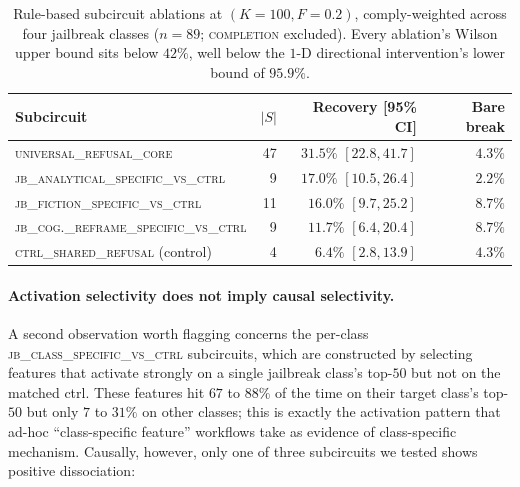 \documentclass{article}
\begin{document}
\begin{table}[h]
\centering
\small
\begin{tabular}{lrrr}
\toprule
Subcircuit & $|S|$ & Recovery [95\% CI] & Bare break \\
\midrule
\textsc{universal\_refusal\_core}              & 47 & $\mathbf{31.5\%}$ $[22.8, 41.7]$ & $4.3\%$ \\
\textsc{jb\_analytical\_specific\_vs\_ctrl}    & 9  & $17.0\%$ $[10.5, 26.4]$ & $2.2\%$ \\
\textsc{jb\_fiction\_specific\_vs\_ctrl}       & 11 & $16.0\%$ $[ 9.7, 25.2]$ & $8.7\%$ \\
\textsc{jb\_cog.\_reframe\_specific\_vs\_ctrl} & 9  & $11.7\%$ $[ 6.4, 20.4]$ & $8.7\%$ \\
\textsc{ctrl\_shared\_refusal} (control)       & 4  & $ 6.4\%$ $[ 2.8, 13.9]$ & $4.3\%$ \\
\bottomrule
\end{tabular}
\caption{Rule-based subcircuit ablations at $(K = 100, F = 0.2)$,
comply-weighted across four jailbreak classes ($n = 89$;
\textsc{completion} excluded). Every ablation's Wilson upper bound
sits below $42\%$, well below the $1$-D directional intervention's
lower bound of $95.9\%$.}
\label{tab:tier2-results}
\end{table}

\paragraph{Activation selectivity does not imply causal selectivity.}
A second observation worth flagging concerns the per-class
\textsc{jb\_class\_specific\_vs\_ctrl} subcircuits, which are
constructed by selecting features that activate strongly on a
single jailbreak class's top-$50$ but not on the matched ctrl.
These features hit $67$ to $88\%$ of the time on their target
class's top-$50$ but only $7$ to $31\%$ on other classes; this is
exactly the activation pattern that ad-hoc ``class-specific
feature'' workflows take as evidence of class-specific mechanism.
Causally, however, only one of three subcircuits we tested shows
positive dissociation:
\end{document}
